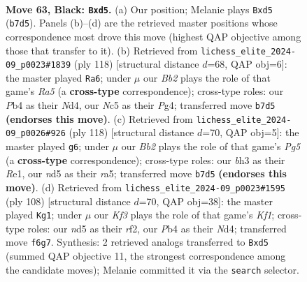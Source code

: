 \documentclass[11pt]{article}
\begin{document}
\clearpage

\begin{figure}[p]\centering
\begin{subfigure}{0.46\textwidth}\centering
\resizebox{\linewidth}{!}{%
\newchessgame
\chessboard[
  setfen={8/Pb6/5k2/2nN2N1/1p3P2/1P2K1PB/7P/R7 b - - 0 63},
  showmover=false,
  pgfstyle=straightmove, color=movearrow, markmove={b7-d5}
]}
\caption{}
\end{subfigure}\hfill
\begin{subfigure}{0.46\textwidth}\centering
\resizebox{\linewidth}{!}{%
\newchessgame
\chessboard[
  setfen={8/3r1k2/5p2/R3n1p1/3NK1Pp/7P/8/8 w - - 15 60},
  showmover=false,
  pgfstyle=straightmove, color=movearrow, markmove={a5-a6}
]}
\caption{}
\end{subfigure}
\\[4pt]
\begin{subfigure}{0.46\textwidth}\centering
\resizebox{\linewidth}{!}{%
\newchessgame
\chessboard[
  setfen={8/kp6/2nK4/r2N1BP1/1p4P1/8/p7/4R3 w - - 2 60},
  showmover=false,
  pgfstyle=straightmove, color=movearrow, markmove={g5-g6}
]}
\caption{}
\end{subfigure}\hfill
\begin{subfigure}{0.46\textwidth}\centering
\resizebox{\linewidth}{!}{%
\newchessgame
\chessboard[
  setfen={8/1p2R3/8/p6p/P2Nnk1P/6p1/5r2/5K2 w - - 1 55},
  showmover=false,
  pgfstyle=straightmove, color=movearrow, markmove={f1-g1}
]}
\caption{}
\end{subfigure}
\caption{\textbf{Move 63, Black: \texttt{Bxd5}.} (a) Our position; Melanie plays \texttt{Bxd5} (\texttt{b7d5}). Panels (b)--(d) are the retrieved master positions whose correspondence most drove this move (highest QAP objective among those that transfer to it). (b) Retrieved from \texttt{lichess\_elite\_2024-09\_p0023\#1839} (ply 118) [structural distance $d$=68, QAP obj=6]: the master played \texttt{Ra6}; under $\mu$ our \emph{Bb2} plays the role of that game's \emph{Ra5} (a \textbf{cross-type} correspondence); cross-type roles: our \emph{P}b4 as their \emph{N}d4, our \emph{N}c5 as their \emph{P}g4; transferred move \texttt{b7d5} \textbf{(endorses this move)}. (c) Retrieved from \texttt{lichess\_elite\_2024-09\_p0026\#926} (ply 118) [structural distance $d$=70, QAP obj=5]: the master played \texttt{g6}; under $\mu$ our \emph{Bb2} plays the role of that game's \emph{Pg5} (a \textbf{cross-type} correspondence); cross-type roles: our \emph{b}h3 as their \emph{R}e1, our \emph{n}d5 as their \emph{r}a5; transferred move \texttt{b7d5} \textbf{(endorses this move)}. (d) Retrieved from \texttt{lichess\_elite\_2024-09\_p0023\#1595} (ply 108) [structural distance $d$=70, QAP obj=38]: the master played \texttt{Kg1}; under $\mu$ our \emph{Kf3} plays the role of that game's \emph{Kf1}; cross-type roles: our \emph{n}d5 as their \emph{r}f2, our \emph{P}b4 as their \emph{N}d4; transferred move \texttt{f6g7}. Synthesis: 2 retrieved analogs transferred to \texttt{Bxd5} (summed QAP objective 11, the strongest correspondence among the candidate moves); Melanie committed it via the \texttt{search} selector.}
\label{fig:thought-m125}
\end{figure}
\end{document}

